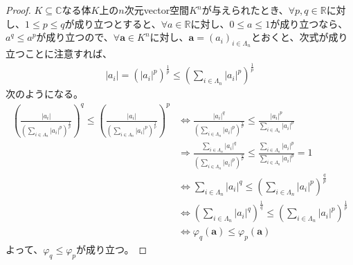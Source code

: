 \documentclass[dvipdfmx]{jsarticle}
\begin{document}
\begin{proof}
$K \subseteq \mathbb{C}$なる体$K$上の$n$次元vector空間$K^{n}$が与えられたとき、$\forall p,q \in \mathbb{R}$に対し、$1 \leq p \leq q$が成り立つとすると、$\forall a \in \mathbb{R}$に対し、$0 \leq a \leq 1$が成り立つなら、$a^{q} \leq a^{p}$が成り立つので、$\forall\mathbf{a} \in K^{n}$に対し、$\mathbf{a} = \left( a_{i} \right)_{i \in \varLambda_{n}}$とおくと、次式が成り立つことに注意すれば、
\begin{align*}
\left| a_{i} \right| = \left( \left| a_{i} \right|^{p} \right)^{\frac{1}{p}} \leq \left( \sum_{i \in \varLambda_{n}} \left| a_{i} \right|^{p} \right)^{\frac{1}{p}}
\end{align*}
次のようになる。
\begin{align*}
\left( \frac{\left| a_{i} \right|}{\left( \sum_{i \in \varLambda_{n}} \left| a_{i} \right|^{p} \right)^{\frac{1}{p}}} \right)^{q} \leq \left( \frac{\left| a_{i} \right|}{\left( \sum_{i \in \varLambda_{n}} \left| a_{i} \right|^{p} \right)^{\frac{1}{p}}} \right)^{p} &\Leftrightarrow \frac{\left| a_{i} \right|^{q}}{\left( \sum_{i \in \varLambda_{n}} \left| a_{i} \right|^{p} \right)^{\frac{q}{p}}} \leq \frac{\left| a_{i} \right|^{p}}{\sum_{i \in \varLambda_{n}} \left| a_{i} \right|^{p}}\\
&\Rightarrow \frac{\sum_{i \in \varLambda_{n}} \left| a_{i} \right|^{q}}{\left( \sum_{i \in \varLambda_{n}} \left| a_{i} \right|^{p} \right)^{\frac{q}{p}}} \leq \frac{\sum_{i \in \varLambda_{n}} \left| a_{i} \right|^{p}}{\sum_{i \in \varLambda_{n}} \left| a_{i} \right|^{p}} = 1\\
&\Leftrightarrow \sum_{i \in \varLambda_{n}} \left| a_{i} \right|^{q} \leq \left( \sum_{i \in \varLambda_{n}} \left| a_{i} \right|^{p} \right)^{\frac{q}{p}}\\
&\Leftrightarrow \left( \sum_{i \in \varLambda_{n}} \left| a_{i} \right|^{q} \right)^{\frac{1}{q}} \leq \left( \sum_{i \in \varLambda_{n}} \left| a_{i} \right|^{p} \right)^{\frac{1}{p}}\\
&\Leftrightarrow \varphi_{q}\left( \mathbf{a} \right) \leq \varphi_{p}\left( \mathbf{a} \right)
\end{align*}
よって、$\varphi_{q} \leq \varphi_{p}$が成り立つ。
\end{proof}
\end{document}
